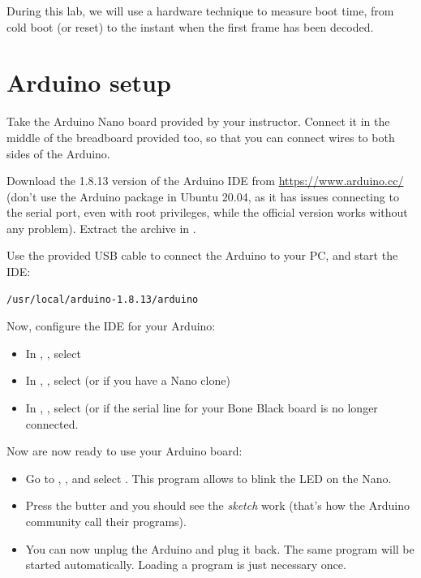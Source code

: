 
During this lab, we will use a hardware technique to measure boot time,
from cold boot (or reset) to the instant when the first frame has been
decoded.

\section{Arduino setup}

Take the Arduino Nano board provided by your instructor. Connect it in
the middle of the breadboard provided too, so that you can connect
wires to both sides of the Arduino.

Download the 1.8.13 version of the Arduino IDE from
\url{https://www.arduino.cc/} (don't use the Arduino
package in Ubuntu 20.04, as it has issues connecting to the serial port,
even with root privileges, while the official version works without any problem).
Extract the archive in .

Use the provided USB cable to connect the Arduino to your PC, and start the IDE:

\begin{verbatim}
/usr/local/arduino-1.8.13/arduino
\end{verbatim}

Now, configure the IDE for your Arduino:
\begin{itemize}
\item In , , select 
\item In , , select  (or
       if you have a Nano clone)
\item In , , select  (or
       if the serial line for your Bone Black board is no longer
      connected.
\end{itemize}

Now are now ready to use your Arduino board:
\begin{itemize}
\item Go to , ,  and select .
      This program allows to blink the LED on the Nano.
\item Press the  butter and you should see the {\em sketch} work
(that's how the Arduino community call their programs).
\item You can now unplug the Arduino and plug it back. The same program
will be started automatically. Loading a program is just necessary once.
\end{itemize}

